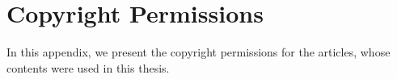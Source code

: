 \def\CHID{1a36}
\chapter{}\label{\CHID_app:a}
\lipsum[1]

\chapter{}\label{\CHID_app:b}
\lipsum[2]

\def\CHID{d4db}
\chapter{}\label{\CHID_app:1}
\lipsum[3]

\chapter{Copyright Permissions}  \label{app:copyright}
In this appendix, we present the copyright permissions for the articles, whose contents were used in this thesis.
